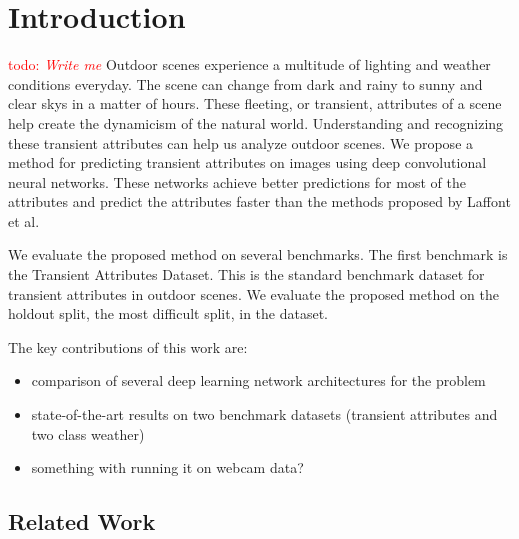\documentclass{article}
\newcommand{\todo}[1]{\textcolor{red}{todo: {\em #1}}}
\begin{document}
\section{Introduction}
\todo{Write me}\newline\indent
Outdoor scenes experience a multitude of lighting and weather conditions
everyday.  The scene can change from dark and rainy to sunny and clear 
skys in a matter of hours.  These fleeting, or transient, attributes of
a scene help create the dynamicism of the natural world.  Understanding 
and recognizing these transient attributes can help us analyze outdoor
scenes. We propose a method for predicting transient attributes on images 
using deep convolutional neural networks.  These networks achieve better 
predictions for most of the attributes and predict the attributes
faster than the methods proposed by Laffont\cite{Laffont14} et al.
\newline


We evaluate the proposed method on several benchmarks.  The first 
benchmark is the Transient Attributes Dataset\cite{Laffont14}.  This 
is the standard benchmark dataset for transient attributes in outdoor
scenes.  We evaluate the proposed method on the holdout split, the 
most difficult split, in the dataset.  


The key contributions of this work are:
\begin{itemize}

  \item comparison of several deep learning network architectures for
    the problem

  \item state-of-the-art results on two benchmark datasets (transient
    attributes and two class weather)

  \item something with running it on webcam data?

\end{itemize}

\subsection{Related Work}
\end{document}
